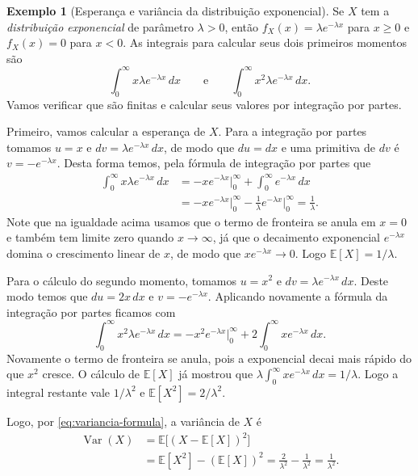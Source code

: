 \documentclass[12pt,portuguese]{article}
\theoremstyle{definition}
\newtheorem{example}[example]{Exemplo}
\theoremstyle{plainexercise}
\theoremstyle{starredexercise}
\theoremstyle{definition}
\begin{document}
\begin{example}[Esperança e variância da distribuição exponencial]\label{ex:esperanca-exponencial}
  Se $X$ tem a \emph{distribuição exponencial} de parâmetro
  $\lambda>0$, então $f_X(x)=\lambda e^{-\lambda x}$ para $x\geqslant0$
  e $f_X(x)=0$ para $x<0$. As integrais para calcular seus dois
  primeiros momentos são
  \[
    \int_0^{\infty} x \lambda e^{-\lambda x}\,dx
    \qquad\text{e}\qquad
    \int_0^{\infty} x^2 \lambda e^{-\lambda x}\,dx.
  \]
Vamos verificar que são finitas e calcular seus valores por
integração por partes.

Primeiro, vamos calcular a esperança de $X$. Para a integração por partes
tomamos $u = x$ e $dv = \lambda e^{-\lambda x}\,dx$,
de modo que $du = dx$ e uma primitiva de $dv$ é $v = -e^{-\lambda x}$.
Desta forma temos, pela fórmula de integração por partes que
\[
\begin{aligned}
\int_0^{\infty} x \lambda e^{-\lambda x}\,dx
&= -x e^{-\lambda x}\Bigr|_0^{\infty}
+ \int_0^{\infty} e^{-\lambda x}\,dx 
\\[0.3cm]
&= -x e^{-\lambda x}\Bigr|_0^{\infty}
- \frac{1}{\lambda} e^{-\lambda x}\Bigr|_0^{\infty}
= \frac{1}{\lambda}.
\end{aligned}
\]
Note que na igualdade acima usamos que o termo de fronteira se anula em $x = 0$ e também tem limite zero quando
$x \to \infty$, já que o decaimento exponencial $e^{-\lambda x}$ domina o
crescimento linear de $x$, de modo que $x e^{-\lambda x} \to 0$. Logo
$\mathbb{E}[X] = 1/\lambda$.

\medskip
Para o cálculo do segundo momento, tomamos $u = x^2$ e
$dv = \lambda e^{-\lambda x}\,dx$. Deste modo temos que $du = 2x\,dx$ e
$v = -e^{-\lambda x}$. Aplicando novamente a fórmula da integração por partes
ficamos com
\[
\int_0^{\infty} x^2 \lambda e^{-\lambda x}\,dx
= -x^2 e^{-\lambda x}\Bigr|_0^{\infty}
+ 2\int_0^{\infty} x e^{-\lambda x}\,dx.
\]
Novamente o termo de fronteira se anula, pois a exponencial decai mais
rápido do que $x^2$ cresce. O cálculo de $\mathbb{E}[X]$ já mostrou
que $\lambda\int_0^\infty x e^{-\lambda x}\,dx=1/\lambda$.
Logo a integral restante vale $1/\lambda^2$ e
$\mathbb{E}[X^2]=2/\lambda^2$.

Logo, por \eqref{eq:variancia-formula}, a variância de $X$ é
\[
\begin{aligned}
\operatorname{Var}(X) &= \mathbb{E}\big[(X - \mathbb{E}[X])^2\big] \\
&= \mathbb{E}[X^2] - (\mathbb{E}[X])^2 = \frac{2}{\lambda^2} - \frac{1}{\lambda^2} = \frac{1}{\lambda^2}.
\end{aligned}
\]
\end{example}
\end{document}
